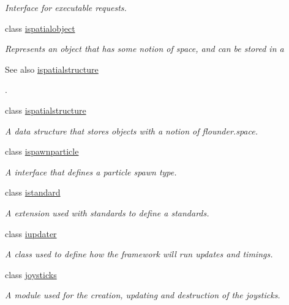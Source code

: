 \begin{DoxyCompactItemize}
\begin{DoxyCompactList}\small\item\em Interface for executable requests. \end{DoxyCompactList}\item 
class \hyperlink{classflounder_1_1ispatialobject}{ispatialobject}
\begin{DoxyCompactList}\small\item\em Represents an object that has some notion of space, and can be stored in a \begin{DoxySeeAlso}{See also}
\hyperlink{classflounder_1_1ispatialstructure}{ispatialstructure}


\end{DoxySeeAlso}
. \end{DoxyCompactList}\item 
class \hyperlink{classflounder_1_1ispatialstructure}{ispatialstructure}
\begin{DoxyCompactList}\small\item\em A data structure that stores objects with a notion of flounder.\+space. \end{DoxyCompactList}\item 
class \hyperlink{classflounder_1_1ispawnparticle}{ispawnparticle}
\begin{DoxyCompactList}\small\item\em A interface that defines a particle spawn type. \end{DoxyCompactList}\item 
class \hyperlink{classflounder_1_1istandard}{istandard}
\begin{DoxyCompactList}\small\item\em A extension used with standards to define a standards. \end{DoxyCompactList}\item 
class \hyperlink{classflounder_1_1iupdater}{iupdater}
\begin{DoxyCompactList}\small\item\em A class used to define how the framework will run updates and timings. \end{DoxyCompactList}\item 
class \hyperlink{classflounder_1_1joysticks}{joysticks}
\begin{DoxyCompactList}\small\item\em A module used for the creation, updating and destruction of the joysticks. \end{DoxyCompactList}\item 

\end{DoxyCompactItemize}
